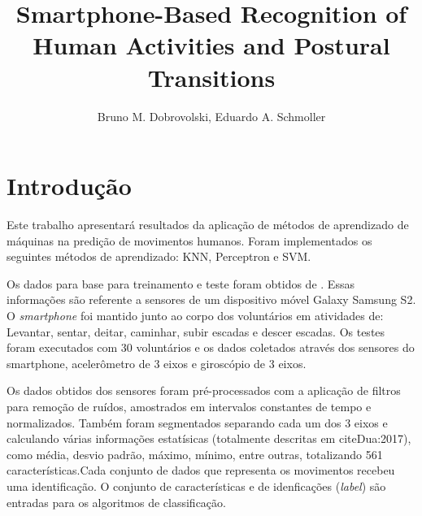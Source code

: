 \documentclass[12pt]{article}
\title{Smartphone-Based Recognition of Human Activities and Postural Transitions}
\author{Bruno M. Dobrovolski\inst{1}, Eduardo A. Schmoller\inst{1}}
\begin{document}
 

\maketitle

%

\section{Introdução}


	Este trabalho apresentará resultados da aplicação de métodos de aprendizado de máquinas na predição de movimentos humanos. Foram implementados os seguintes métodos de aprendizado: KNN, Perceptron e SVM. 
	
	Os dados para base para treinamento e teste foram obtidos de \cite{Dua:2017}. Essas informações são referente a sensores de um dispositivo móvel Galaxy Samsung S2. O \textit{smartphone} foi mantido junto ao corpo dos voluntários em atividades de: Levantar, sentar, deitar, caminhar, subir escadas e descer escadas. Os testes foram executados com 30 voluntários e os dados coletados através dos sensores do smartphone, acelerômetro de 3 eixos e giroscópio de 3 eixos.
	
	Os dados obtidos dos sensores foram pré-processados com a aplicação de filtros para remoção de ruídos, amostrados em intervalos constantes de tempo e normalizados. Também foram segmentados separando cada um dos 3 eixos e calculando várias informações estatísicas (totalmente descritas em cite{Dua:2017}), como média, desvio padrão, máximo, mínimo, entre outras, totalizando 561 características.Cada conjunto de dados que representa os movimentos recebeu uma identificação. O conjunto de características e de idenficações (\emph{label}) são entradas para os algoritmos de classificação.
	
\end{document}
